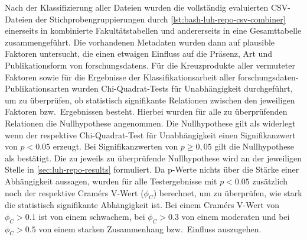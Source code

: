 Nach der Klassifizierung aller Dateien wurden die vollständig evaluierten CSV-Dateien der Stichprobengruppierungen durch \cref{lst:bash-luh-repo-csv-combiner} einerseits in kombinierte Fakultätstabellen und andererseits in eine Gesamttabelle zusammengeführt.
Die vorhandenen Metadaten wurden dann auf plausible Faktoren untersucht, die einen etwaigen Einfluss auf die Präsenz, Art und Publikationsform von \glspl{forschungsdaten}.
Für die Kreuzprodukte aller vermuteter Faktoren sowie für die Ergebnisse der Klassifikationsarbeit aller \gls{forschungsdaten}-Publikationsarten wurden Chi-Quadrat-Tests für Unabhängigkeit durchgeführt, um zu überprüfen, ob statistisch signifikante Relationen zwischen den jeweiligen Faktoren bzw.~Ergebnissen besteht.
Hierbei wurden für alle zu überprüfenden Relationen die Nullhypothese angenommen.
Die Nullhypothese gilt als widerlegt wenn der respektive Chi-Quadrat-Test für Unabhängigkeit einen Signifikanzwert von $p<\num{0,05}$ erzeugt.
Bei Signifikanzwerten von $p\geqslant0,05$ gilt die Nullhypothese als bestätigt.
Die zu jeweils zu überprüfende Nullhypothese wird an der jeweiligen Stelle in \cref{sec:luh-repo-results} formuliert.
Da p-Werte nichts über die Stärke einer Abhängigkeit aussagen, wurden für alle Testergebnisse mit $p<\num{0,05}$ zusätzlich noch der respektive Cramérs V-Wert ($\phi_C$) berechnet, um zu überprüfen, wie stark die statistisch signifikante Abhängigkeit ist.
Bei einem Cramérs V-Wert von $\phi_C>\num{0,1}$ ist von einem schwachem, bei $\phi_C>\num{0,3}$ von einem moderaten und bei $\phi_C>\num{0,5}$ von einem starken Zusammenhang bzw.~Einfluss auszugehen.

